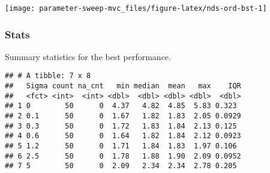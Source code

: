 \documentclass[]{book}
\newenvironment{Shaded}{\begin{snugshade}}{\end{snugshade}}
\newcommand{\DataTypeTok}[1]{\textcolor[rgb]{0.13,0.29,0.53}{#1}}
\newcommand{\KeywordTok}[1]{\textcolor[rgb]{0.13,0.29,0.53}{\textbf{#1}}}
\newcommand{\NormalTok}[1]{#1}
\newcommand{\OperatorTok}[1]{\textcolor[rgb]{0.81,0.36,0.00}{\textbf{#1}}}
\newcommand{\OtherTok}[1]{\textcolor[rgb]{0.56,0.35,0.01}{#1}}
\newcommand{\StringTok}[1]{\textcolor[rgb]{0.31,0.60,0.02}{#1}}
\begin{document}
\texttt{[image: parameter-sweep-mvc\_files/figure-latex/nds-ord-bst-1]}

\hypertarget{stats-42}{%
\subsubsection{Stats}\label{stats-42}}

Summary statistics for the best performance.

\begin{Shaded}
\end{Shaded}

\begin{verbatim}
## # A tibble: 7 x 8
##   Sigma count na_cnt   min median  mean   max    IQR
##   <fct> <int>  <int> <dbl>  <dbl> <dbl> <dbl>  <dbl>
## 1 0        50      0  4.37   4.82  4.85  5.83 0.323 
## 2 0.1      50      0  1.67   1.82  1.83  2.05 0.0929
## 3 0.3      50      0  1.72   1.83  1.84  2.13 0.125 
## 4 0.6      50      0  1.64   1.82  1.84  2.12 0.0923
## 5 1.2      50      0  1.71   1.84  1.83  1.97 0.106 
## 6 2.5      50      0  1.78   1.88  1.90  2.09 0.0952
## 7 5        50      0  2.09   2.34  2.34  2.78 0.205
\end{verbatim}
\end{document}
